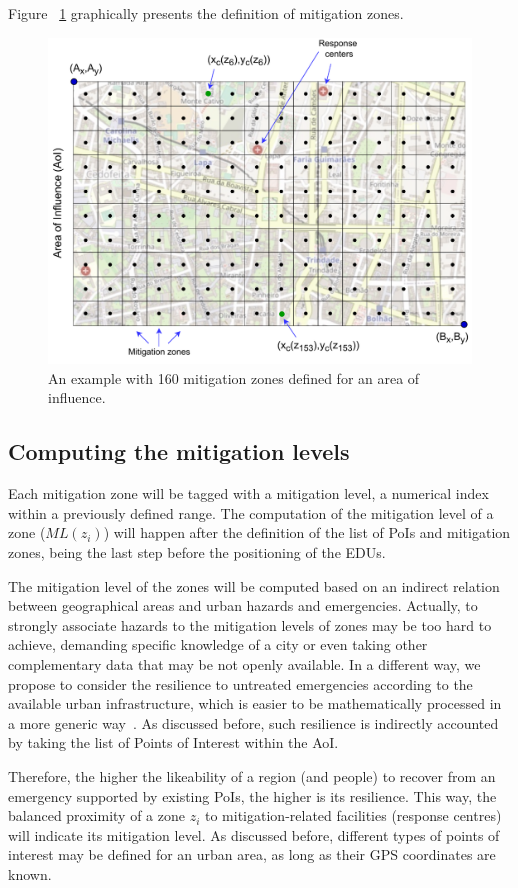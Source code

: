 \begin{refsection}
Figure ~\ref{Fig:figGrid} graphically presents the definition of mitigation zones.

\begin{figure}[htb!]
  \centering
  \includegraphics[width=0.77\linewidth]{Chapters/3-EDUs/images/MitigationZones.pdf}
  \caption{An example with 160 mitigation zones defined for an area of influence.}\label{Fig:figGrid}
\end{figure}

%
\subsection{Computing the mitigation levels}

Each mitigation zone will be tagged with a mitigation level, a numerical index within a previously defined range. The computation of the mitigation level of a zone ($ML(z_i)$) will happen after the definition of the list of PoIs and mitigation zones, being the last step before the positioning of the EDUs. 

The mitigation level of the zones will be computed based on an indirect relation between geographical areas and urban hazards and emergencies. Actually, to strongly associate hazards to the mitigation levels of zones may be too hard to achieve, demanding specific knowledge of a city or even taking other complementary data that may be not openly available. In a different way, we propose to consider the resilience to untreated emergencies according to the available urban infrastructure, which is easier to be mathematically processed in a more generic way~\cite{emergencies1}. As discussed before, such resilience is indirectly accounted by taking the list of Points of Interest within the AoI.

Therefore, the higher the likeability of a region (and people) to recover from an emergency supported by existing PoIs, the higher is its resilience. This way, the balanced proximity of a zone $z_i$ to mitigation-related facilities (response centres) will indicate its mitigation level. As discussed before, different types of points of interest may be defined for an urban area, as long as their GPS coordinates are known.


\end{refsection}
